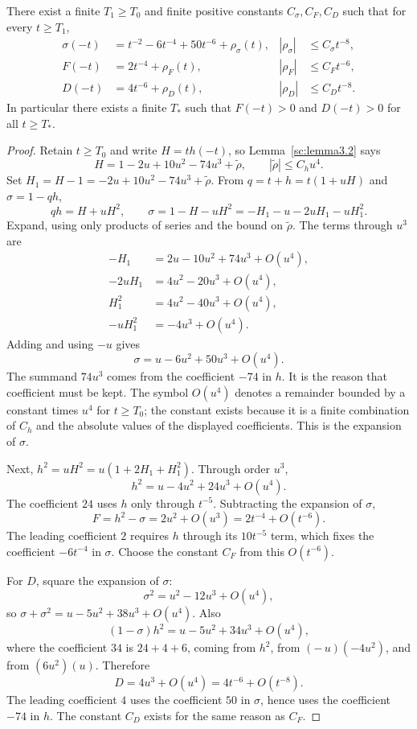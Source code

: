 \begin{lemma}\label{sc:lemma3.3}
There exist a finite \(T_1\ge T_0\) and finite positive constants \(C_\sigma,C_F,C_D\) such that for every \(t\ge T_1\),
\begin{align*}
\sigma(-t)&=t^{-2}-6t^{-4}+50t^{-6}+\rho_\sigma(t),
&|\rho_\sigma|&\le C_\sigma t^{-8},\\[4pt]
F(-t)&=2t^{-4}+\rho_F(t),
&|\rho_F|&\le C_F t^{-6},\\[4pt]
D(-t)&=4t^{-6}+\rho_D(t),
&|\rho_D|&\le C_D t^{-8}.
\end{align*}
In particular there exists a finite \(T_*\) such that \(F(-t)>0\) and \(D(-t)>0\) for all \(t\ge T_*\).

\end{lemma}
\begin{proof}
Retain \(t\ge T_0\) and write \(H=th(-t)\), so Lemma~\ref{sc:lemma3.2} says
\[
H=1-2u+10u^2-74u^3+\tilde\rho,\qquad |\tilde\rho|\le C_h u^4.
\]
Set \(H_1=H-1=-2u+10u^2-74u^3+\tilde\rho\). From \(q=t+h=t(1+uH)\) and \(\sigma=1-qh\),
\[
qh=H+uH^2,\qquad \sigma=1-H-uH^2=-H_1-u-2uH_1-uH_1^2.
\]
Expand, using only products of series and the bound on \(\tilde\rho\). The terms through \(u^3\) are
\begin{align*}
-H_1&=2u-10u^2+74u^3+O(u^4),\\
-2uH_1&=4u^2-20u^3+O(u^4),\\
H_1^2&=4u^2-40u^3+O(u^4),\\
-uH_1^2&=-4u^3+O(u^4).
\end{align*}
Adding and using \(-u\) gives
\[
\sigma=u-6u^2+50u^3+O(u^4).
\]
The summand \(74u^3\) comes from the coefficient \(-74\) in \(h\). It is the reason that coefficient must be kept. The symbol \(O(u^4)\) denotes a remainder bounded by a constant times \(u^4\) for \(t\ge T_0\); the constant exists because it is a finite combination of \(C_h\) and the absolute values of the displayed coefficients. This is the expansion of \(\sigma\).

Next, \(h^2=uH^2=u(1+2H_1+H_1^2)\). Through order \(u^3\),
\[
h^2=u-4u^2+24u^3+O(u^4).
\]
The coefficient \(24\) uses \(h\) only through \(t^{-5}\). Subtracting the expansion of \(\sigma\),
\[
F=h^2-\sigma=2u^2+O(u^3)=2t^{-4}+O(t^{-6}).
\]
The leading coefficient \(2\) requires \(h\) through its \(10t^{-5}\) term, which fixes the coefficient \(-6t^{-4}\) in \(\sigma\). Choose the constant \(C_F\) from this \(O(t^{-6})\).

For \(D\), square the expansion of \(\sigma\):
\[
\sigma^2=u^2-12u^3+O(u^4),
\]
so \(\sigma+\sigma^2=u-5u^2+38u^3+O(u^4)\). Also
\[
(1-\sigma)h^2=u-5u^2+34u^3+O(u^4),
\]
where the coefficient \(34\) is \(24+4+6\), coming from \(h^2\), from \((-\,u)(-4u^2)\), and from \((6u^2)(u)\). Therefore
\[
D=4u^3+O(u^4)=4t^{-6}+O(t^{-8}).
\]
The leading coefficient \(4\) uses the coefficient \(50\) in \(\sigma\), hence uses the coefficient \(-74\) in \(h\). The constant \(C_D\) exists for the same reason as \(C_F\).


\end{proof}
